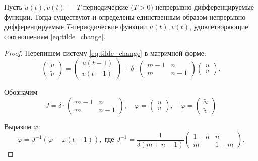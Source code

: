 \begin{lemma}
	\label{lm:uv_from_tilde}
	Пусть $\tilde{u}(t), \tilde{v}(t)$ --- $T$-периодические ($T > 0$) непрерывно дифференцируемые функции. Тогда существуют и определены единственным образом непрерывно дифференцируемые $T$-периодические функции $u(t), v(t)$, удовлетворяющие соотношениям \eqref{eq:tilde_change}.
\end{lemma}
\begin{proof}
	Перепишем систему \eqref{eq:tilde_change} в матричной форме:
	\[
	\begin{pmatrix}
		\tilde{u}\\
		\tilde{v}
	\end{pmatrix} = 
	\begin{pmatrix}
		u(t - 1)\\
		v(t - 1)
	\end{pmatrix} +
	\delta \cdot
	\begin{pmatrix}
		m - 1 & n \\
		m & n - 1
	\end{pmatrix}
	\begin{pmatrix}
		u\\
		v
	\end{pmatrix}.
	\]
	
	Обозначим
	\[
	J = 
	\delta \cdot
	\begin{pmatrix}
		m - 1 & n \\
		m & n - 1
	\end{pmatrix}, \quad
	\varphi =
	\begin{pmatrix}
		u\\
		v
	\end{pmatrix}, \quad
	\tilde{\varphi} =
	\begin{pmatrix}
		\tilde{u}\\
		\tilde{v}
	\end{pmatrix}
	\]
	
	Выразим $\varphi$:
	\begin{equation}
		\label{eq:tilde_matrix_form}
		\varphi = 
		J^{-1}
		\left(
		\tilde{\varphi} -
		\varphi(t - 1)
		\right),
		\text{ где }
		J^{-1} = \dfrac{1}{\delta(m + n - 1)} 
		\begin{pmatrix}
			1 - n & n \\
			m & 1 - m
		\end{pmatrix}.
	\end{equation}
	

\end{proof}
